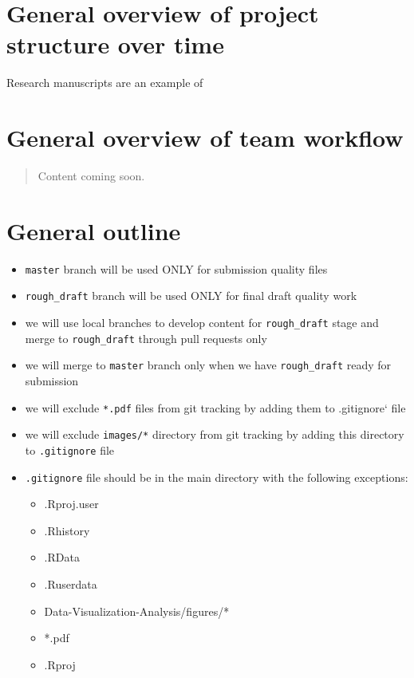 \documentclass[]{book}
\providecommand{\tightlist}{%
  \setlength{\itemsep}{0pt}\setlength{\parskip}{0pt}}
\begin{document}
\section{General overview of project structure over
time}\label{general-overview-of-project-structure-over-time}

Research manuscripts are an example of

\section{General overview of team
workflow}\label{general-overview-of-team-workflow}

\begin{quote}
Content coming soon.
\end{quote}

\section{General outline}\label{general-outline}

\begin{itemize}
\tightlist
\item
  \texttt{master} branch will be used ONLY for submission quality files
\item
  \texttt{rough\_draft} branch will be used ONLY for final draft quality
  work
\item
  we will use local branches to develop content for
  \texttt{rough\_draft} stage and merge to \texttt{rough\_draft} through
  pull requests only
\item
  we will merge to \texttt{master} branch only when we have
  \texttt{rough\_draft} ready for submission
\item
  we will exclude \texttt{*.pdf} files from git tracking by adding them
  to .gitignore` file
\item
  we will exclude \texttt{images/*} directory from git tracking by
  adding this directory to \texttt{.gitignore} file
\item
  \texttt{.gitignore} file should be in the main directory with the
  following exceptions:

  \begin{itemize}
  \tightlist
  \item
    .Rproj.user
  \item
    .Rhistory
  \item
    .RData
  \item
    .Ruserdata
  \item
    Data-Visualization-Analysis/figures/*
  \item
    *.pdf
  \item
    .Rproj
  \end{itemize}
\end{itemize}
\end{document}
